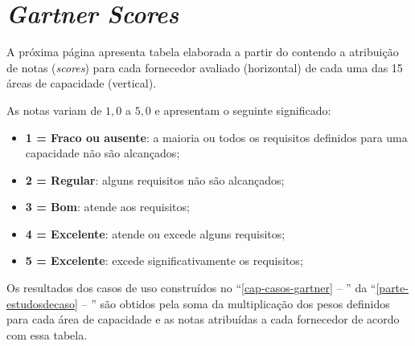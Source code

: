 \chapter{\emph{Gartner Scores}}
\label{anexo-tabelacc}


A próxima página apresenta tabela elaborada a partir do \relatorioGCC contendo a atribuição de notas (\emph{scores}) para cada fornecedor avaliado (horizontal) de cada uma das 15 áreas de capacidade (vertical).

As notas variam de $1,0$ a $5,0$ e apresentam o seguinte significado:

\begin{itemize}
    \item \textbf{1 = Fraco ou ausente}: a maioria ou todos os requisitos definidos para uma capacidade não são alcançados;   
    \item \textbf{2 = Regular}: alguns requisitos não são alcançados;
    \item \textbf{3 = Bom}: atende aos requisitos;
    \item \textbf{4 = Excelente}: atende ou excede alguns requisitos;   
    \item \textbf{5 = Excelente}: excede significativamente os requisitos;
\end{itemize}

Os resultados dos casos de uso construídos no ``\autoref{cap-casos-gartner} -- '' da ``\autoref{parte-estudosdecaso} -- '' são obtidos pela soma da multiplicação dos pesos definidos para cada área de capacidade e as notas atribuídas a cada fornecedor de acordo com essa tabela. 
\thispagestyle{empty}
\begin{landscape}
    
\end{landscape}